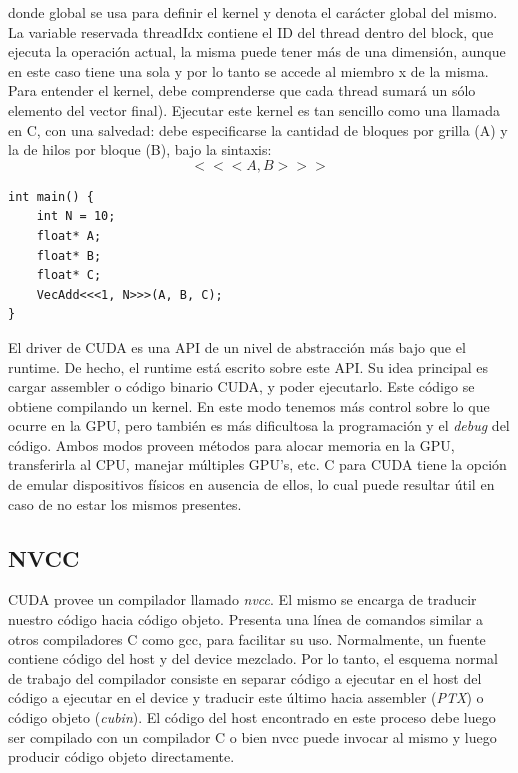 donde global se usa para definir el kernel y denota el car\'acter global del mismo.
La variable reservada threadIdx contiene el ID del thread dentro del block, que ejecuta la operaci\'on actual, la misma puede tener m\'as de una dimensi\'on, aunque en este caso tiene una sola y por lo tanto se accede al miembro x de la misma.
Para entender el kernel, debe comprenderse que cada thread sumar\'a un s\'olo elemento del vector final).
Ejecutar este kernel es tan sencillo como una llamada en C, con una salvedad: debe especificarse la cantidad de bloques por grilla (A) y la de hilos por bloque (B), bajo la sintaxis:
$$<<<A , B >>>$$

\begin{verbatim}
int main() {
    int N = 10;
    float* A;
    float* B;
    float* C;
    VecAdd<<<1, N>>>(A, B, C);
}

\end{verbatim}


El driver de CUDA es una API de un nivel de abstracci\'on m\'as bajo que el runtime.
De hecho, el runtime est\'a escrito sobre este API.
Su idea principal es cargar assembler o c\'odigo binario CUDA, y poder ejecutarlo.
Este c\'odigo se obtiene compilando un kernel.
En este modo tenemos m\'as control sobre lo que ocurre en la GPU, pero tambi\'en es m\'as dificultosa la programaci\'on y el {\em debug} del c\'odigo.
Ambos modos proveen m\'etodos para alocar memoria en la GPU, transferirla al CPU, manejar m\'ultiples GPU's, etc.
C para CUDA tiene la opci\'on de emular dispositivos f\'isicos en ausencia de ellos, lo cual puede resultar \'util en caso de no estar los mismos presentes.

\subsection{NVCC}
CUDA provee un compilador llamado {\em nvcc}.
El mismo se encarga de traducir nuestro c\'odigo hacia c\'odigo objeto.
Presenta una l\'inea de comandos similar a otros compiladores C como gcc, para facilitar su uso.
Normalmente, un fuente contiene c\'odigo del host y del device mezclado.
Por lo tanto, el esquema normal de trabajo del compilador consiste en separar c\'odigo a ejecutar en el host del c\'odigo a ejecutar en el device y traducir este \'ultimo hacia assembler ({\em PTX}) o c\'odigo objeto ({\em cubin}).
El c\'odigo del host encontrado en este proceso debe luego ser compilado con un compilador C o bien nvcc puede invocar al mismo y luego producir c\'odigo objeto directamente.

